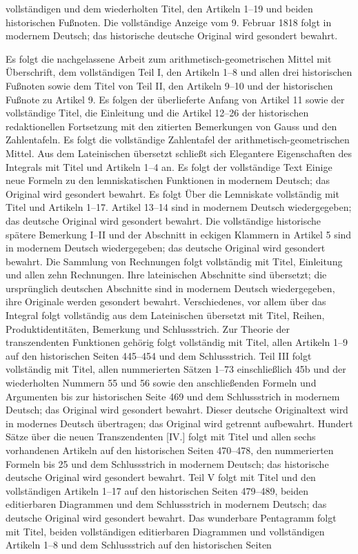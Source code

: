 vollständigen und dem wiederholten Titel, den Artikeln 1–19 und beiden historischen Fußnoten. Die vollständige Anzeige vom 9. Februar 1818 folgt in modernem Deutsch; das historische deutsche Original wird gesondert bewahrt. \par\endgroup\clearpage\thispagestyle{empty}\medskip
\begingroup\fontsize{9}{9.7}\selectfont\raggedright
Es folgt die nachgelassene Arbeit zum arithmetisch-geometrischen Mittel mit Überschrift, dem vollständigen Teil I, den Artikeln 1–8 und allen drei historischen Fußnoten sowie dem Titel von Teil II, den Artikeln 9–10 und der historischen Fußnote zu Artikel 9. Es folgen der überlieferte Anfang von Artikel 11 sowie der vollständige Titel, die Einleitung und die Artikel 12–26 der historischen redaktionellen Fortsetzung mit den zitierten Bemerkungen von Gauss und den Zahlentafeln. Es folgt die vollständige Zahlentafel der arithmetisch-geometrischen Mittel. Aus dem Lateinischen übersetzt schließt sich Elegantere Eigenschaften des Integrals mit Titel und Artikeln 1–4 an. Es folgt der vollständige Text Einige neue Formeln zu den lemniskatischen Funktionen in modernem Deutsch; das Original wird gesondert bewahrt. Es folgt Über die Lemniskate vollständig mit Titel und Artikeln 1–17. Artikel 13–14 sind in modernem Deutsch wiedergegeben; das deutsche Original wird gesondert bewahrt. Die vollständige historische spätere Bemerkung I–II und der Abschnitt in eckigen Klammern in Artikel 5 sind in modernem Deutsch wiedergegeben; das deutsche Original wird gesondert bewahrt. Die Sammlung von Rechnungen folgt vollständig mit Titel, Einleitung und allen zehn Rechnungen. Ihre lateinischen Abschnitte sind übersetzt; die ursprünglich deutschen Abschnitte sind in modernem Deutsch wiedergegeben, ihre Originale werden gesondert bewahrt. Verschiedenes, vor allem über das Integral folgt vollständig aus dem Lateinischen übersetzt mit Titel, Reihen, Produktidentitäten, Bemerkung und Schlussstrich. Zur Theorie der transzendenten Funktionen gehörig folgt vollständig mit Titel, allen Artikeln 1--9 auf den historischen Seiten 445--454 und dem Schlussstrich. Teil III folgt vollständig mit Titel, allen nummerierten Sätzen 1--73 einschließlich 45b und der wiederholten Nummern 55 und 56 sowie den anschließenden Formeln und Argumenten bis zur historischen Seite 469 und dem Schlussstrich in modernem Deutsch; das Original wird gesondert bewahrt. Dieser deutsche Originaltext wird in modernes Deutsch übertragen; das Original wird getrennt aufbewahrt. Hundert Sätze über die neuen Transzendenten [IV.] folgt mit Titel und allen sechs vorhandenen Artikeln auf den historischen Seiten 470--478, den nummerierten Formeln bis 25 und dem Schlussstrich in modernem Deutsch; das historische deutsche Original wird gesondert bewahrt. Teil V folgt mit Titel und den vollständigen Artikeln 1--17 auf den historischen Seiten 479--489, beiden editierbaren Diagrammen und dem Schlussstrich in modernem Deutsch; das deutsche Original wird gesondert bewahrt. Das wunderbare Pentagramm folgt mit Titel, beiden vollständigen editierbaren Diagrammen und vollständigen Artikeln 1--8 und dem Schlussstrich auf den historischen Seiten 